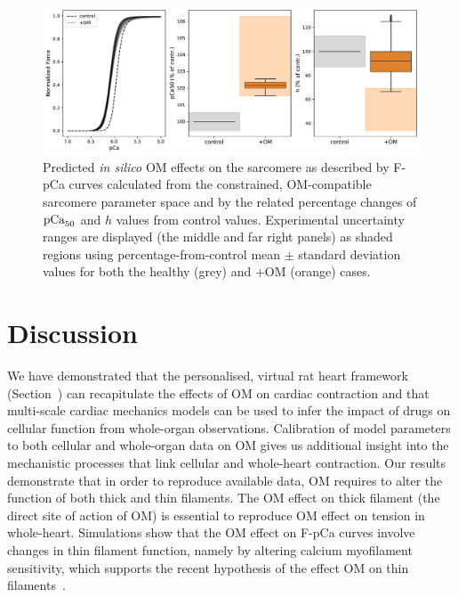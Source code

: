 \begin{figure}[!ht]
    \myfloatalign
    \includegraphics[width=\textwidth]{figures/chapter05/Fig2.pdf}
    \caption{Predicted \textit{in silico} OM effects on the sarcomere as described by F-pCa curves calculated from the constrained, OM-compatible sarcomere parameter space and by the related percentage changes of $\textrm{pCa}_{50}$ and $h$ values from control values. Experimental uncertainty ranges are displayed (the middle and far right panels) as shaded regions using percentage-from-control mean $\pm$ standard deviation values for both the healthy (grey) and $+$OM (orange) cases.}
    \label{fig:wave0mappingtofpCa}
\end{figure}


%
%
%
\section{Discussion}\label{sec:ch5discussion}
We have demonstrated that the personalised, virtual rat heart framework (Section~) can recapitulate the effects of OM on cardiac contraction and that multi-scale cardiac mechanics models can be used to infer the impact of drugs on cellular function from whole-organ observations. Calibration of model parameters to both cellular and whole-organ data on OM gives us additional insight into the mechanistic processes that link cellular and whole-heart contraction. Our results demonstrate that in order to reproduce available data, OM requires to alter the function of both thick and thin filaments. The OM effect on thick filament (the direct site of action of OM) is essential to reproduce OM effect on tension in whole-heart. Simulations show that the OM effect on F-pCa curves involve changes in thin filament function, namely by altering calcium myofilament sensitivity, which supports the recent hypothesis of the effect OM on thin filaments~\cite{Swenson:2017}.


%
%
%
